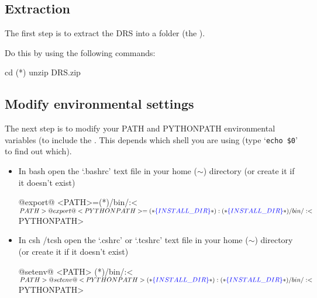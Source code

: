 \subsection{Extraction}
\label{ch:install:installunix:extraction}

The first step is to extract the DRS into a folder (the \InstallDIR).

\noindent Do this by using the following commands:
\begin{cmdbox}
cd (*\InstallDIRcmd*)
unzip DRS.zip
\end{cmdbox}

\subsection{Modify environmental settings}
\label{ch:install:installunix:environ_settings}

The next step is to modify your PATH and PYTHONPATH environmental variables (to include the \InstallDIR. This depends which shell you are using (type `\lstinline[style=bashstyle]{echo $0}' to find out which).

\begin{itemize}
	\item In bash open the `.bashrc' text file in your home ($\sim$) directory (or create it if it doesn't exist)

	\begin{bashbox}
	@export@ <PATH>=(*\InstallDIR*)/bin/:<$PATH>

	@export@ <PYTHONPATH>=(*\InstallDIR*):(*\InstallDIR*)/bin/:<$PYTHONPATH>
	\end{bashbox}

	\item In csh /tcsh open the `.cshrc' or `.tcshrc' text file in your home ($\sim$) directory (or create it if it doesn't exist) 

	\begin{cshbox}
	@setenv@ <PATH> (*\InstallDIR*)/bin/:<${PATH}>

	@setenv@ <PYTHONPATH> (*\InstallDIR*):(*\InstallDIR*)/bin/:<${PYTHONPATH}>
	\end{cshbox}

\end{itemize}

